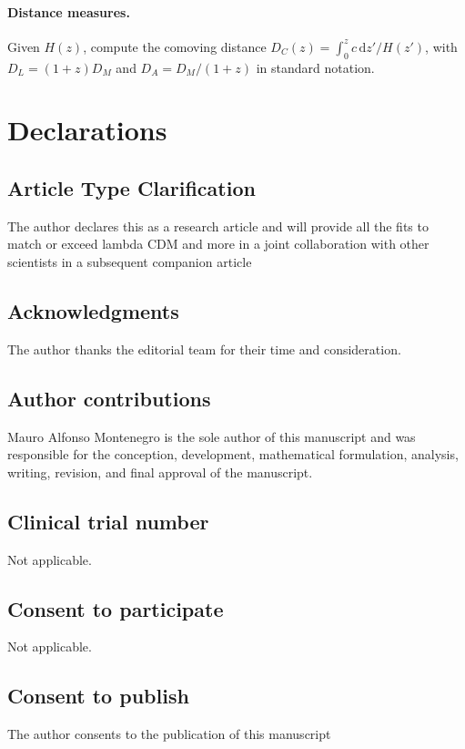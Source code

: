 \documentclass[12pt]{article}
\newcommand{\dd}{\mathrm{d}}
\begin{document}
\paragraph{Distance measures.}
Given $H(z)$, compute the comoving distance $D_{C}(z)=\int_{0}^{z} c\,\dd z'/H(z')$, with $D_{L}=(1+z)D_{M}$ and $D_{A}=D_{M}/(1+z)$ in standard notation.

\section*{Declarations}

\subsection*{Article Type Clarification}
The author declares this as a research article and will provide all the fits to match or exceed lambda CDM and more in a joint collaboration with other scientists in a subsequent companion article 


\subsection*{Acknowledgments}
The author thanks the editorial team for their time and consideration.

\subsection*{Author contributions}
Mauro Alfonso Montenegro is the sole author of this manuscript and was responsible for the conception, development, mathematical formulation, analysis, writing, revision, and final approval of the manuscript.

\subsection*{Clinical trial number}
Not applicable. 

\subsection*{Consent to participate}
Not applicable.

\subsection*{Consent to publish}
The author consents to the publication of this manuscript 
\end{document}
